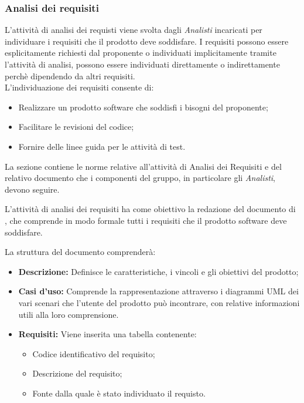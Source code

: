 \subsubsection{Analisi dei requisiti}
L'attività di analisi dei requisti viene svolta dagli \textit{Analisti} incaricati per individuare i requisiti che il prodotto deve soddisfare.
I requisiti possono essere esplicitamente richiesti dal proponente o individuati implicitamente tramite l'attività di analisi, possono essere individuati direttamente o indirettamente perchè dipendendo da altri requisiti. \\
L'individuazione dei requisiti consente di:
\begin{itemize}
	\item Realizzare un prodotto software che soddisfi i bisogni del proponente;
	\item Facilitare le revisioni del codice;
	\item Fornire delle linee guida per le attività di test.
\end{itemize}

La sezione contiene le norme relative all'attività di Analisi dei Requisiti e del relativo documento \AdR che i componenti del gruppo, in particolare gli \textit{Analisti}, devono seguire.

L'attività di analisi dei requisiti ha come obiettivo la redazione del documento di \AdR, che comprende in modo formale tutti i requisiti che il prodotto software deve soddisfare.

La struttura del documento comprenderà:
\begin{itemize}
	\item \textbf{Descrizione:} Definisce le caratteristiche, i vincoli e gli obiettivi del prodotto;
	\item \textbf{Casi d'uso:} Comprende la rappresentazione attraverso i diagrammi UML dei vari scenari che l'utente del prodotto può incontrare, con relative informazioni utili alla loro comprensione.
	\item \textbf{Requisiti:} Viene inserita una tabella contenente:
	\begin{itemize}
		\item Codice identificativo del requisito;
		\item Descrizione del requisito;
		\item Fonte dalla quale è stato individuato il requisto. 
	\end{itemize} 
\end{itemize}

